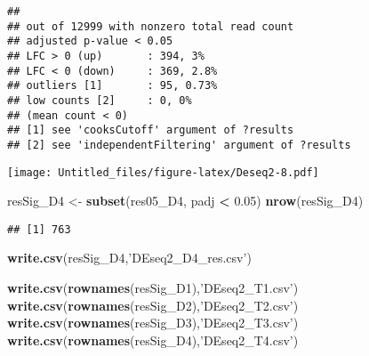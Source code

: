\documentclass[]{article}
\newenvironment{Shaded}{\begin{snugshade}}{\end{snugshade}}
\newcommand{\DataTypeTok}[1]{\textcolor[rgb]{0.13,0.29,0.53}{#1}}
\newcommand{\DecValTok}[1]{\textcolor[rgb]{0.00,0.00,0.81}{#1}}
\newcommand{\FloatTok}[1]{\textcolor[rgb]{0.00,0.00,0.81}{#1}}
\newcommand{\KeywordTok}[1]{\textcolor[rgb]{0.13,0.29,0.53}{\textbf{#1}}}
\newcommand{\NormalTok}[1]{#1}
\newcommand{\OperatorTok}[1]{\textcolor[rgb]{0.81,0.36,0.00}{\textbf{#1}}}
\newcommand{\StringTok}[1]{\textcolor[rgb]{0.31,0.60,0.02}{#1}}
\begin{document}
\begin{verbatim}
## 
## out of 12999 with nonzero total read count
## adjusted p-value < 0.05
## LFC > 0 (up)       : 394, 3%
## LFC < 0 (down)     : 369, 2.8%
## outliers [1]       : 95, 0.73%
## low counts [2]     : 0, 0%
## (mean count < 0)
## [1] see 'cooksCutoff' argument of ?results
## [2] see 'independentFiltering' argument of ?results
\end{verbatim}

\begin{Shaded}
\end{Shaded}

\texttt{[image: Untitled\_files/figure-latex/Deseq2-8.pdf]}

\begin{Shaded}
\begin{Highlighting}[]
\NormalTok{resSig_D4 <-}\StringTok{ }\KeywordTok{subset}\NormalTok{(res05_D4, padj }\OperatorTok{<}\StringTok{ }\FloatTok{0.05}\NormalTok{)}
\KeywordTok{nrow}\NormalTok{(resSig_D4)}
\end{Highlighting}
\end{Shaded}

\begin{verbatim}
## [1] 763
\end{verbatim}

\begin{Shaded}
\begin{Highlighting}[]
\KeywordTok{write.csv}\NormalTok{(resSig_D4,}\StringTok{'DEseq2_D4_res.csv'}\NormalTok{)}

\KeywordTok{write.csv}\NormalTok{(}\KeywordTok{rownames}\NormalTok{(resSig_D1),}\StringTok{'DEseq2_T1.csv'}\NormalTok{)}
\KeywordTok{write.csv}\NormalTok{(}\KeywordTok{rownames}\NormalTok{(resSig_D2),}\StringTok{'DEseq2_T2.csv'}\NormalTok{)}
\KeywordTok{write.csv}\NormalTok{(}\KeywordTok{rownames}\NormalTok{(resSig_D3),}\StringTok{'DEseq2_T3.csv'}\NormalTok{)}
\KeywordTok{write.csv}\NormalTok{(}\KeywordTok{rownames}\NormalTok{(resSig_D4),}\StringTok{'DEseq2_T4.csv'}\NormalTok{)}
\end{Highlighting}
\end{Shaded}
\end{document}
